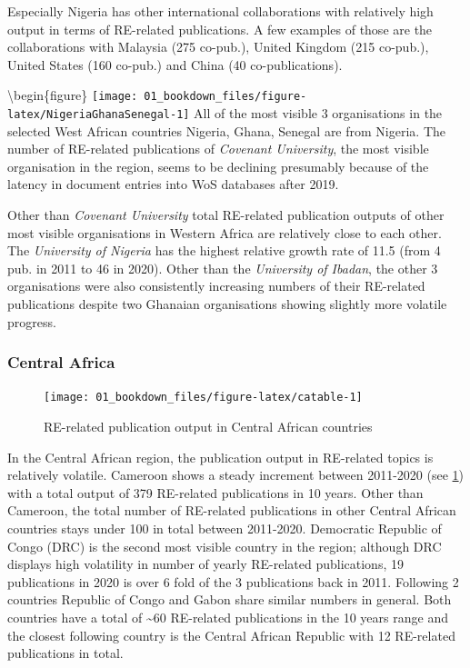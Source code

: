 \documentclass[
]{book}
\begin{document}
Especially Nigeria has other international collaborations with relatively high output in terms of RE-related publications. A few examples of those are the collaborations with Malaysia (275 co-pub.), United Kingdom (215 co-pub.), United States (160 co-pub.) and China (40 co-publications).

\textbackslash begin\{figure\}
\texttt{[image: 01\_bookdown\_files/figure-latex/NigeriaGhanaSenegal-1]}
All of the most visible 3 organisations in the selected West African countries Nigeria, Ghana, Senegal are from Nigeria. The number of RE-related publications of \emph{Covenant University}, the most visible organisation in the region, seems to be declining presumably because of the latency in document entries into WoS databases after 2019.

Other than \emph{Covenant University} total RE-related publication outputs of other most visible organisations in Western Africa are relatively close to each other. The \emph{University of Nigeria} has the highest relative growth rate of 11.5 (from 4 pub. in 2011 to 46 in 2020). Other than the \emph{University of Ibadan}, the other 3 organisations were also consistently increasing numbers of their RE-related publications despite two Ghanaian organisations showing slightly more volatile progress.

\hypertarget{central-africa}{%
\subsubsection{Central Africa}\label{central-africa}}

\begin{figure}
\texttt{[image: 01\_bookdown\_files/figure-latex/catable-1]} \caption{RE-related publication output in Central African countries}\label{fig:catable}
\end{figure}

In the Central African region, the publication output in RE-related topics is relatively volatile. Cameroon shows a steady increment between 2011-2020 (see \ref{fig:catable}) with a total output of 379 RE-related publications in 10 years. Other than Cameroon, the total number of RE-related publications in other Central African countries stays under 100 in total between 2011-2020. Democratic Republic of Congo (DRC) is the second most visible country in the region; although DRC displays high volatility in number of yearly RE-related publications, 19 publications in 2020 is over 6 fold of the 3 publications back in 2011. Following 2 countries Republic of Congo and Gabon share similar numbers in general. Both countries have a total of \textasciitilde60 RE-related publications in the 10 years range and the closest following country is the Central African Republic with 12 RE-related publications in total.
\end{document}
